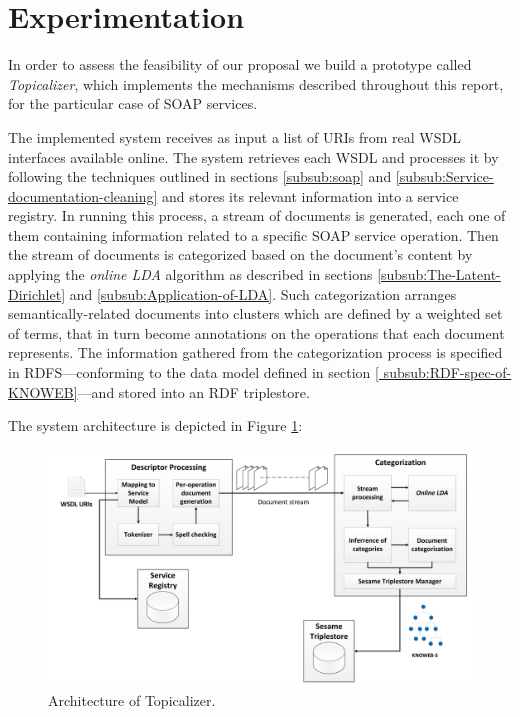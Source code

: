 \section{Experimentation}
\label{sec:experimentation}

\noindent In order to assess the feasibility of our proposal we build a prototype called \emph{Topicalizer}, which implements the mechanisms described throughout this report, for the particular case of SOAP services. 

The implemented system receives as input a list of URIs from real WSDL interfaces available online. The system retrieves each WSDL and processes it by following the techniques outlined in sections \ref{subsub:soap} and \ref{subsub:Service-documentation-cleaning} and stores its relevant information into a service registry. In running this process, a stream of documents is generated, each one of them containing information related to a specific SOAP service operation. Then the stream of documents is categorized based on the document's content by applying the \emph{online LDA} algorithm as described in sections \ref{subsub:The-Latent-Dirichlet} and \ref{subsub:Application-of-LDA}. Such categorization arranges semantically-related documents into clusters which are defined by a weighted set of terms, that in turn become annotations on the operations that each document represents. The information gathered from the categorization process is specified in RDFS---conforming to the data model defined in section \ref{
subsub:RDF-spec-of-KNOWEB}---and stored into an RDF triplestore.

The system architecture is depicted in Figure \ref{prototype-architecture}:

\begin{figure}
\includegraphics[scale=0.20]{images/prototype-architecture}

\caption{Architecture of Topicalizer.}
\label{prototype-architecture}

\end{figure}


